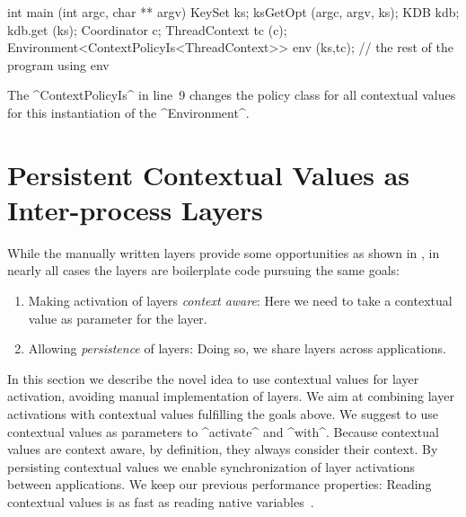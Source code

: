 \begin{code}[language=Cpp]
int main (int argc, char ** argv)
{
	KeySet ks;
	ksGetOpt (argc, argv, ks);
	KDB kdb;
	kdb.get (ks);
	Coordinator c;
	ThreadContext tc (c);
	Environment<ContextPolicyIs<ThreadContext>> env (ks,tc);
	// the rest of the program using env
}
\end{code}


The ^ContextPolicyIs^ in line~9 changes the policy class for all contextual values for this instantiation of the ^Environment^.





\section{Persistent Contextual Values as Inter-process Layers}
\label{sec:mobile}

While the manually written layers provide some opportunities as shown in , in nearly all cases the layers are boilerplate code pursuing the same goals:
\begin{enumerate}
\item Making activation of layers \emph{context aware}:
Here we need to take a contextual value as parameter for the layer.
\item Allowing \emph{persistence} of layers:
Doing so, we share layers across applications.
\end{enumerate}

In this section we describe the novel idea to use contextual values for layer activation, avoiding manual implementation of layers.
We aim at combining layer activations with contextual values fulfilling the goals above.
We suggest to use contextual values as parameters to ^activate^ and ^with^.
Because contextual values are context aware, by definition, they always consider their context.
By persisting contextual values we enable synchronization of layer activations between applications.
We keep our previous performance properties:
Reading contextual values is as fast as reading native variables~\cite{raab2016persistent}.

